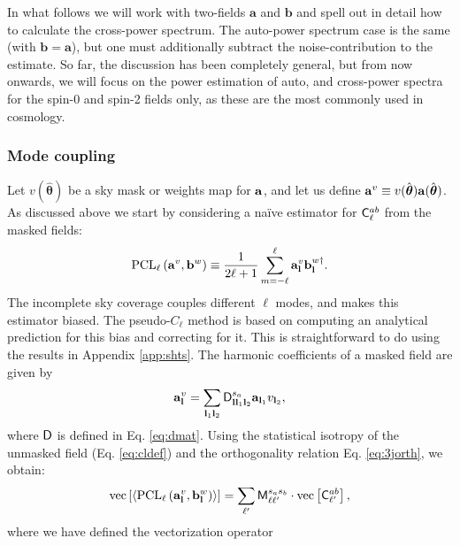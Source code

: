 \documentclass[usenatbib]{mnrasb}
\newcommand{\nv}{\hat{\boldsymbol{\theta}}}
\newcommand{\va}{{\mathbf{a}}}
\newcommand{\vb}{{\mathbf{b}}}
\begin{document}
        In what follows we will work with two-fields $\va$ and $\vb$ and spell out in detail how to calculate the cross-power spectrum. The auto-power spectrum case is the same (with $\vb=\va$), but one must additionally subtract the noise-contribution to the estimate. So far, the discussion has been completely general, but from now onwards, we will focus on the power estimation of auto, and cross-power spectra for the spin-0 and spin-2 fields only, as these are the most commonly used in cosmology.

      \subsubsection{Mode coupling}\label{sssec:maths.pcl101.mcoup}
        Let $v(\nv)$ be a sky mask or weights map for ${\bf a}$, and let us define ${\bf a}^v\equiv v(\nv){\bf a}(\nv)$. As discussed above we start by considering a na\"ive estimator for ${\sf C}^{ab}_\ell$ from the masked fields:
        \begin{equation}\label{eq:pcldef}
          {\rm PCL}_\ell\left({\bf a}^v,{\bf b}^w\right)\equiv\frac{1}{2\ell+1}\sum_{m=-\ell}^\ell{\bf a}^v_{\bf l}{\bf b}^{w\dag}_{\bf l}.
        \end{equation}
        The incomplete sky coverage couples different $\ell$ modes, and makes this estimator biased. The pseudo-$C_\ell$ method is based on computing an analytical prediction for this bias and correcting for it. This is straightforward to do using the results in Appendix \ref{app:shts}. The harmonic coefficients of a masked field are given by
        \begin{equation}
          {\bf a}^v_{\bf l}=\sum_{{\bf l}_1{\bf l}_2}{\sf D}^{s_a}_{{\bf l}{\bf l}_1{\bf l}_2}{\bf a}_{{\bf l}_1}v_{{\bf l}_2},
        \end{equation}
        where ${\sf D}$ is defined in Eq. \ref{eq:dmat}. Using the statistical isotropy of the unmasked field (Eq. \ref{eq:cldef}) and the orthogonality relation Eq. \ref{eq:3jorth}, we obtain:
        \begin{equation}\label{eq:modecoup}
          {\rm vec}\left[\left\langle{\rm PCL}_\ell\left({\bf a}^v_{\bf l},{\bf b}^w_{\bf l}\right)\right\rangle\right]=\sum_{\ell'}{\sf M}^{s_as_b}_{\ell\ell'}\cdot{\rm vec}\left[{\sf C}^{ab}_{\ell'}\right],
        \end{equation}
        where we have defined the vectorization operator \citep{2008PhRvD..77j3013H}
\end{document}

